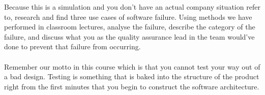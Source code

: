Because this is a simulation and you don't have an actual company situation refer to, research and find three use cases of software failure. Using methods we have performed in classroom lectures, analyse the failure, describe the category of the failure, and discuss what you as the quality assurance lead in the team would've done to prevent that failure from occurring.
\\
\\

Remember our motto in this course which is that you cannot test your way out of a bad design. Testing is something that is baked into the structure of the product right from the first minutes that you begin to construct the software architecture.










